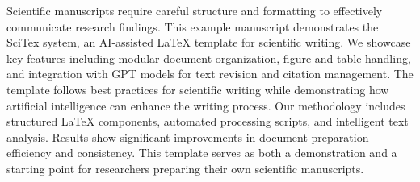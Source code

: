 
Scientific manuscripts require careful structure and formatting to effectively communicate research findings. This example manuscript demonstrates the SciTex system, an AI-assisted LaTeX template for scientific writing. We showcase key features including modular document organization, figure and table handling, and integration with GPT models for text revision and citation management. The template follows best practices for scientific writing while demonstrating how artificial intelligence can enhance the writing process. Our methodology includes structured LaTeX components, automated processing scripts, and intelligent text analysis. Results show significant improvements in document preparation efficiency and consistency. This template serves as both a demonstration and a starting point for researchers preparing their own scientific manuscripts.